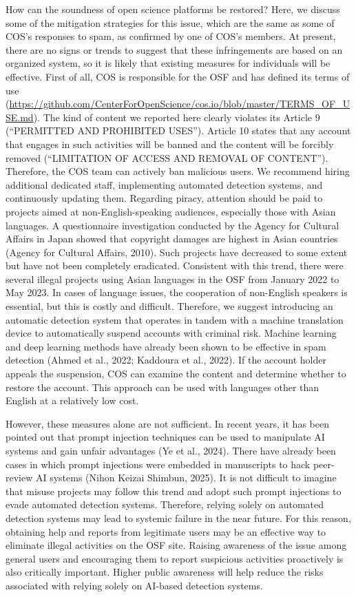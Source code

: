 \documentclass[authordate, meta]{jote-new-article}
\begin{document}
	How can the soundness of open science platforms be restored? Here, we discuss some of the mitigation strategies for this issue, which are the same as some of COS's responses to spam, as confirmed by one of COS's members. At present, there are no signs or trends to suggest that these infringements are based on an organized system, so it is likely that existing measures for individuals will be effective. First of all, COS is responsible for the OSF and has defined its terms of use (\url{https://github.com/CenterForOpenScience/cos.io/blob/master/TERMS\_OF\_USE.md}). The kind of content we reported here clearly violates its Article 9 (“PERMITTED AND PROHIBITED USES”). Article 10 states that any account that engages in such activities will be banned and the content will be forcibly removed (“LIMITATION OF ACCESS AND REMOVAL OF CONTENT”). Therefore, the COS team can actively ban malicious users. We recommend hiring additional dedicated staff, implementing automated detection systems, and continuously updating them. Regarding piracy, attention should be paid to projects aimed at non-English-speaking audiences, especially those with Asian languages. A questionnaire investigation conducted by the Agency for Cultural Affairs in Japan showed that copyright damages are highest in Asian countries (Agency for Cultural Affairs, 2010). Such projects have decreased to some extent but have not been completely eradicated. Consistent with this trend, there were several illegal projects using Asian languages in the OSF from January 2022 to May 2023. In cases of language issues, the cooperation of non-English speakers is essential, but this is costly and difficult. Therefore, we suggest introducing an automatic detection system that operates in tandem with a machine translation device to automatically suspend accounts with criminal risk. Machine learning and deep learning methods have already been shown to be effective in spam detection (Ahmed et al., 2022; Kaddoura et al., 2022). If the account holder appeals the suspension, COS can examine the content and determine whether to restore the account. This approach can be used with languages other than English at a relatively low cost.



	However, these measures alone are not sufficient. In recent years, it has been pointed out that prompt injection techniques can be used to manipulate AI systems and gain unfair advantages (Ye et al., 2024). There have already been cases in which prompt injections were embedded in manuscripts to hack peer-review AI systems (Nihon Keizai Shimbun, 2025). It is not difficult to imagine that misuse projects may follow this trend and adopt such prompt injections to evade automated detection systems. Therefore, relying solely on automated detection systems may lead to systemic failure in the near future. For this reason, obtaining help and reports from legitimate users may be an effective way to eliminate illegal activities on the OSF site. Raising awareness of the issue among general users and encouraging them to report suspicious activities proactively is also critically important. Higher public awareness will help reduce the risks associated with relying solely on AI-based detection systems.
\end{document}
